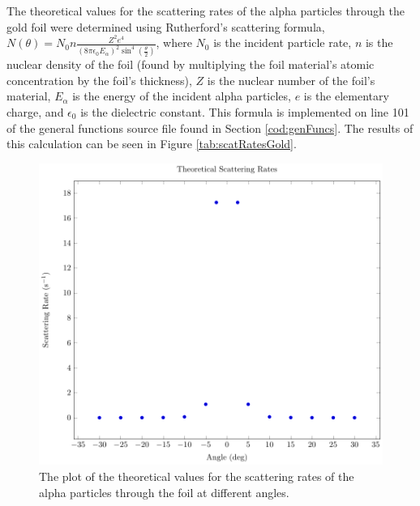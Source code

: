 \documentclass[a4paper]{article}
\begin{document}
\qq

\qq The theoretical values for the scattering rates of the alpha particles
through the gold foil were determined using Rutherford's scattering formula, \(
N (\theta) = N_0 n \frac{Z^2 e^4}{(8 \pi \epsilon_0 E_{\alpha})^2 \sin^4
  \left( \frac{\theta}{2} \right)} \), where \( N_0 \) is the incident particle
rate, \( n \) is the nuclear density of the foil (found by multiplying the
foil material's atomic concentration by the foil's thickness), \( Z \) is the
nuclear number of the foil's material, \( E_{\alpha} \) is the energy of the
incident alpha particles, \( e \) is the elementary charge, and \( \epsilon_0 \)
is the dielectric constant. This formula is implemented on line 101 of the
general functions source file found in Section \ref{cod:genFuncs}. The results
of this calculation can be seen in Figure \ref{tab:scatRatesGold}.

\begin{figure}[H]
  \begin{center}
    \includegraphics[scale=0.8]{Plots/TheoreticalScatteringRates/theoScatRates.pdf}
  \end{center}
  \caption{The plot of the theoretical values for the scattering rates of the
    alpha particles through the foil at different angles.}
  \label{gph:theoScatRatesGold}
\end{figure}
\end{document}
